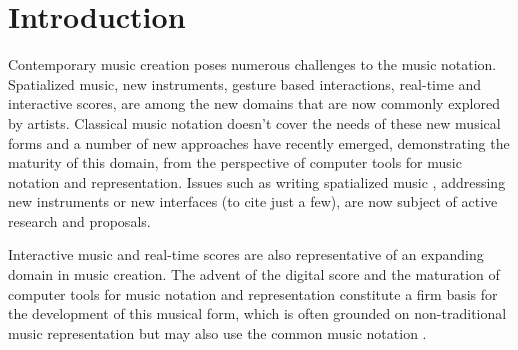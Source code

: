 \documentclass{article}
\title{\papertitle}
\newcommand{\sExpr}{\emph{score expressions}}
\begin{document}
\capstartfalse
\maketitle
\capstarttrue

%
\begin{abstract}
INScore is an environment for the design of augmented interactive music scores turned to non-conventional use of music notation. The environment allows arbitrary graphic resources to be used and composed for the music representation. It supports symbolic music notation, described using Guido Music Notation or MusicXML formats. The environment has been extended to provided score level composition using a set of operators that consistently take scores as arguments to compute new scores as output. INScore API supports now \sExpr\ both at OSC and at scripting levels. The work is based on previous research that solved issues of  notational consistency across the composition of scores. This paper focuses on the language level and explains different strategies in the evaluation of score expressions.
\end{abstract}
%

\section{Introduction}\label{sec:introduction}

Contemporary music creation poses numerous challenges to the music notation. Spatialized music, new instruments, gesture based interactions, real-time and interactive scores, are among the new domains that are now commonly explored by artists. 
Classical music notation doesn't cover the needs of these new musical forms and a number of new approaches have recently emerged, demonstrating the maturity of this domain, from the perspective of computer tools for music notation and representation.
Issues such as writing spatialized music \cite{Ellberger_tenor2015}, addressing new instruments \cite{tmays:2014} or new interfaces \cite{kschlei:2015} (to cite just a few), are now subject of active research and proposals.

Interactive music and real-time scores are also representative of an expanding domain in  music creation. The advent of the digital score and the maturation of computer tools for music notation and representation constitute a firm basis for the development of this musical form, which is often grounded on non-traditional music representation \cite{RSmith_tenor2015} \cite{Hope_tenor2015} but may also use the common music notation \cite{Hoadley12,hoadley14}. 
\end{document}
